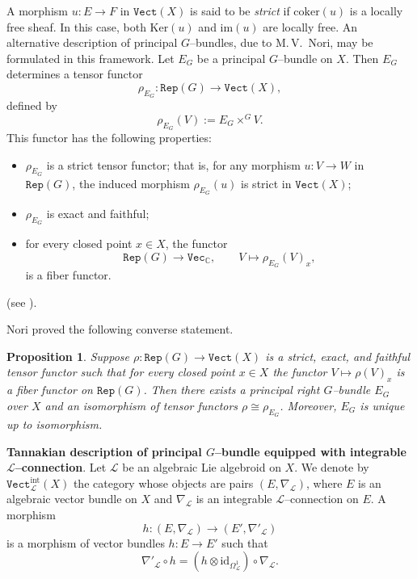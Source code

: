 \documentclass[12pt,reqno]{amsart}
\renewcommand{\ker}{\mathrm{Ker}}
\numberwithin{equation}{subsection}
\newtheorem{proposition}[equation]{Proposition}
\theoremstyle{definition}
\theoremstyle{theorem}
\begin{document}
A morphism $u:E\to F$ in $\texttt{Vect}(X)$ is said to be \emph{strict} if
$\mathrm{coker}(u)$ is a locally free sheaf. In this case, both
$\ker(u)$ and $\mathrm{im}(u)$ are locally free. 
An alternative description of principal $G$--bundles, due to M.\,V.~Nori, may be
formulated in this framework. Let $E_{G}$ be a principal $G$--bundle on $X$.
Then $E_{G}$ determines a tensor functor
\begin{equation}\label{eq:nori-functor}
	\rho_{E_{G}} : \texttt{Rep}(G) \longrightarrow \texttt{Vect}(X),
\end{equation}
defined by
\[
\rho_{E_{G}}(V) := E_{G} \times^{G} V .
\]
This functor has the following properties:
\begin{itemize}
	\item $\rho_{E_{G}}$ is a strict tensor functor; that is, for any morphism
	$u:V\to W$ in $\texttt{Rep}(G)$, the induced morphism
	$\rho_{E_{G}}(u)$ is strict in $\texttt{Vect}(X)$;
	
	\item $\rho_{E_{G}}$ is exact and faithful;
	
	\item for every closed point $x\in X$, the functor
	\[
	\texttt{Rep}(G)\longrightarrow \texttt{Vec}_{\mathbb{C}},
	\qquad V \longmapsto \rho_{E_{G}}(V)_{x},
	\]
	is a fiber functor.
\end{itemize}
(see \cite{Balaji-2006}).

Nori proved the following converse statement.

\begin{proposition}\label{def:Nori-descrpton of PB}\cite{M.V.Nori-1976}
	Suppose $\rho:\texttt{Rep}(G)\longrightarrow \texttt{Vect}(X)$
	is a strict, exact, and faithful tensor functor such that for every closed point
	$x\in X$ the functor $V\mapsto \rho(V)_{x}$ is a fiber functor on
	$\texttt{Rep}(G)$. Then there exists a principal right $G$--bundle $E_{G}$ over
	$X$ and an isomorphism of tensor functors $\rho \cong \rho_{E_{G}}$. Moreover,
	$E_{G}$ is unique up to isomorphism.
\end{proposition}


\medskip

\noindent\textbf{Tannakian description of principal $G$--bundle equipped with integrable $\mathcal{L}$--connection}. Let $\mathcal{L}$ be an algebraic Lie algebroid on $X$. We denote by
$\texttt{Vect}^{\text{int}}_{\mathcal{L}}(X)$ the category whose objects are pairs
$(E,\nabla_{\mathcal{L}})$, where $E$ is an algebraic vector bundle on $X$
and $\nabla_{\mathcal{L}}$ is an integrable $\mathcal{L}$--connection on $E$.
A morphism
\[
h : (E,\nabla_{\mathcal{L}}) \longrightarrow (E',\nabla'_{\mathcal{L}})
\]
is a morphism of vector bundles $h:E\to E'$ such that
\[
\nabla'_{\mathcal{L}} \circ h
= (h \otimes \mathrm{id}_{\Omega^{1}_{\mathcal{L}}}) \circ \nabla_{\mathcal{L}} .
\]
\end{document}

